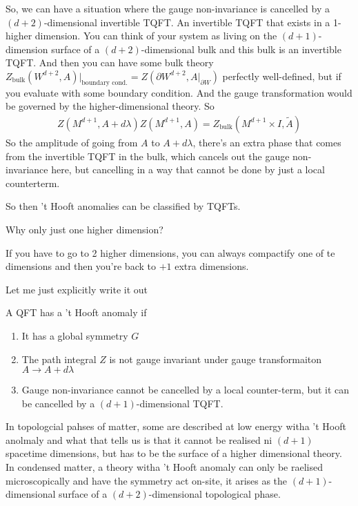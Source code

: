 So,
we can have a situation where the gauge non-invariance is cancelled by a
$(d+2)$-dimensional invertible TQFT.
An invertible TQFT that exists in a 1-higher dimension.
You can think of your system as living on the $(d+1)$-dimension surface of a
$(d+2)$-dimensional bulk and this bulk is an invertible TQFT.
And then you can have some bulk theory
$Z_{\text{bulk}}\left( W^{d+2}, A \right)|_{\text{boundary cond.}}
= Z\left( \partial W^{d+2}, A|_{\partial W} \right)$
perfectly well-defined,
but if you evaluate with some boundary condition.
And the gauge transformation would be governed by the higher-dimensional theory.
So
\begin{align}
    Z\left( M^{d+1}, A + d\lambda \right)
    Z\left( M^{d+1}, A \right)
    = Z_{\text{bulk}}\left( M^{d+1}\times I, \tilde{A} \right)
\end{align}
So the amplitude of going from $A$ to $A + d\lambda$,
there's an extra phase that comes from the invertible TQFT in the bulk,
which cancels out the gauge non-invariance here,
but cancelling in a way that cannot be done by just a local counterterm.

So then 't Hooft anomalies can be classified by TQFTs.

\begin{question}
    Why only just one higher dimension?
\end{question}
If you have to go to 2 higher dimensions,
you can always compactify one of te dimensions
and then you're back to $+1$ extra dimensions.

Let me just explicitly write it out

A QFT has a 't Hooft anomaly if
\begin{enumerate}
    \item It has a global symmetry $G$
    \item The path integral $Z$ is not gauge invariant under gauge
        transformaiton $A\to A + d\lambda$
    \item Gauge non-invariance cannot be cancelled by a local counter-term,
        but it can be cancelled by a $(d+1)$-dimensional TQFT.
\end{enumerate}
In topologcial pahses of matter,
some are described at low energy witha 't Hooft anolmaly
and what that tells us is that it cannot be realised ni $(d+1)$ spacetime
dimensions,
but has to be the surface of a higher dimensional theory.
In condensed matter,
a theory witha 't Hooft anomaly can only be raelised microscopically
and have the symmetry act on-site,
it arises as the $(d+1)$-dimensional surface of a $(d+2)$-dimensional
topological phase.

